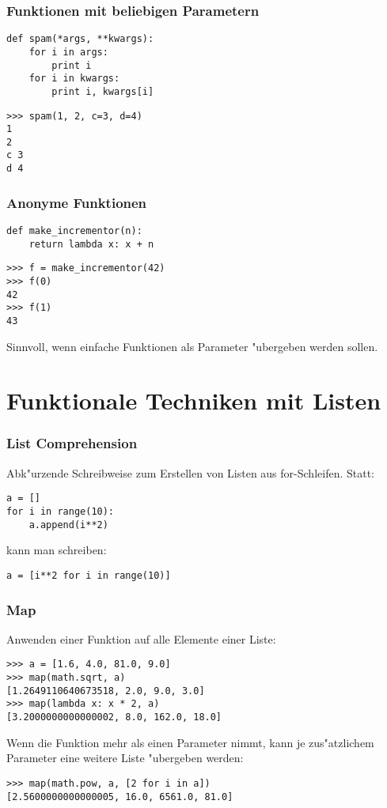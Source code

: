 \begin{frame}[fragile]
\frametitle{Funktionen mit beliebigen Parametern}
\begin{lstlisting}
def spam(*args, **kwargs):
    for i in args:
        print i
    for i in kwargs:
        print i, kwargs[i]
\end{lstlisting}
\begin{lstlisting}[style=Shell]
>>> spam(1, 2, c=3, d=4)
1
2
c 3
d 4
\end{lstlisting}
\end{frame}

\begin{frame}[fragile]
\frametitle{Anonyme Funktionen}
\begin{lstlisting}
def make_incrementor(n):
    return lambda x: x + n
\end{lstlisting}
\begin{lstlisting}[style=Shell]
>>> f = make_incrementor(42)
>>> f(0)
42
>>> f(1)
43
\end{lstlisting}
Sinnvoll, wenn einfache Funktionen als Parameter "ubergeben werden sollen.
\end{frame}

\section{Funktionale Techniken mit Listen}

\begin{frame}[fragile]
\frametitle{List Comprehension}
Abk"urzende Schreibweise zum Erstellen von Listen aus for-Schleifen. Statt:
\begin{lstlisting}
a = []
for i in range(10):
    a.append(i**2)
\end{lstlisting}
kann man schreiben:
\begin{lstlisting}
a = [i**2 for i in range(10)]
\end{lstlisting}
\end{frame}

\begin{frame}[fragile]
\frametitle{Map}
Anwenden einer Funktion auf alle Elemente einer Liste:
\begin{lstlisting}[style=Shell]
>>> a = [1.6, 4.0, 81.0, 9.0]
>>> map(math.sqrt, a)
[1.2649110640673518, 2.0, 9.0, 3.0]
>>> map(lambda x: x * 2, a)
[3.2000000000000002, 8.0, 162.0, 18.0]
\end{lstlisting}
Wenn die Funktion mehr als einen Parameter nimmt, kann je zus"atzlichem Parameter eine weitere Liste "ubergeben werden:
\begin{lstlisting}[style=Shell]
>>> map(math.pow, a, [2 for i in a])
[2.5600000000000005, 16.0, 6561.0, 81.0]
\end{lstlisting}
\end{frame} 

